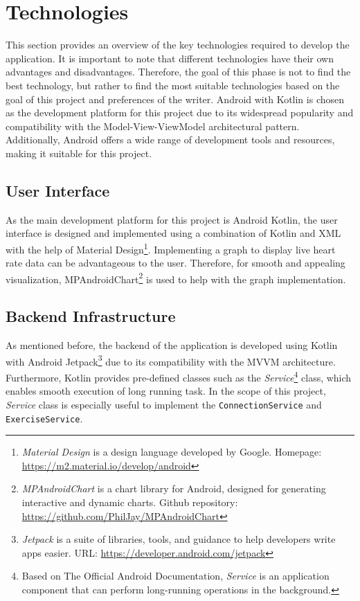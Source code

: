 \section{Technologies}
\label{chap:tech}
This section provides an overview of the key technologies required to develop the application. It is important to note that different technologies have their own advantages and disadvantages. Therefore, the goal of this phase is not to find the best technology, but rather to find the most suitable technologies based on the goal of this project and preferences of the writer. 
Android with Kotlin is chosen as the development platform for this project due to its widespread popularity and compatibility with the Model-View-ViewModel architectural pattern. Additionally, Android offers a wide range of development tools and resources, making it suitable for this project.

\subsection{User Interface}
As the main development platform for this project is Android Kotlin, the user interface is designed and implemented using a combination of Kotlin and XML with the help of Material Design\footnote{\emph{Material Design} is a design language developed by Google. Homepage: \url{https://m2.material.io/develop/android}}.
Implementing a graph to display live heart rate data can be advantageous to the user. Therefore, for smooth and appealing visualization, MPAndroidChart\footnote{\emph{MPAndroidChart} is a chart library for Android, designed for generating interactive and dynamic charts. Github repository: \url{https://github.com/PhilJay/MPAndroidChart}} is used to help with the graph implementation.
\subsection{Backend Infrastructure}
As mentioned before, the backend of the application is developed using Kotlin with Android Jetpack\footnote{\emph{Jetpack} is a suite of libraries, tools, and guidance to help developers write apps easier. URL: \url{https://developer.android.com/jetpack}} due to its compatibility with the MVVM architecture. 
Furthermore, Kotlin provides pre-defined classes such as the \emph{Service}\footnote{Based on The Official Android Documentation, \emph{Service} is an application component that can perform long-running operations in the background.\autocite{android-services}} class, which enables smooth execution of long running task. In the scope of this project, \emph{Service} class is especially useful to implement the \texttt{ConnectionService} and \texttt{ExerciseService}.

